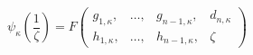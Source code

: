 \begin{equation}
\psi_{\kappa}\left( \frac{1}{\zeta}\right)=F\left(
\begin{array}{cccc}
g_{1,\kappa}, & \dots, & g_{n-1,\kappa}, & d_{n,\kappa}\\
h_{1,\kappa}, & \dots, & h_{n-1,\kappa}, & \zeta
\end{array}
\right)
\end{equation}


